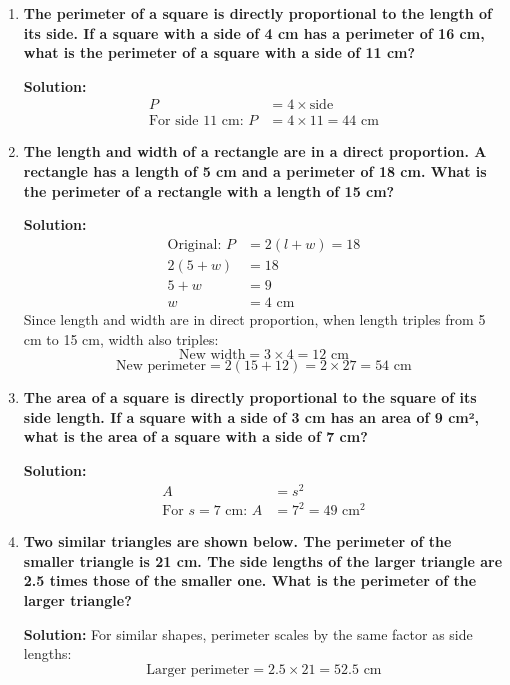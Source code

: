 \documentclass[12pt]{article}
\begin{document}
\begin{enumerate}[resume]
    \item \textbf{The perimeter of a square is directly proportional to the length of its side. If a square with a side of 4 cm has a perimeter of 16 cm, what is the perimeter of a square with a side of 11 cm?}
    
    \textbf{Solution:}
    \begin{align*}
        P &= 4 \times \text{side} \\
        \text{For side 11 cm: } P &= 4 \times 11 = 44 \text{ cm}
    \end{align*}
    
    \item \textbf{The length and width of a rectangle are in a direct proportion. A rectangle has a length of 5 cm and a perimeter of 18 cm. What is the perimeter of a rectangle with a length of 15 cm?}
    
    \textbf{Solution:}
    \begin{align*}
        \text{Original: } P &= 2(l + w) = 18 \\
        2(5 + w) &= 18 \\
        5 + w &= 9 \\
        w &= 4 \text{ cm}
    \end{align*}
    Since length and width are in direct proportion, when length triples from 5 cm to 15 cm, width also triples:
    \[
    \text{New width} = 3 \times 4 = 12 \text{ cm}
    \]
    \[
    \text{New perimeter} = 2(15 + 12) = 2 \times 27 = 54 \text{ cm}
    \]
    
    \item \textbf{The area of a square is directly proportional to the square of its side length. If a square with a side of 3 cm has an area of 9 cm², what is the area of a square with a side of 7 cm?}
    
    \textbf{Solution:}
    \begin{align*}
        A &= s^2 \\
        \text{For } s = 7 \text{ cm: } A &= 7^2 = 49 \text{ cm}^2
    \end{align*}
    
    \item \textbf{Two similar triangles are shown below. The perimeter of the smaller triangle is 21 cm. The side lengths of the larger triangle are 2.5 times those of the smaller one. What is the perimeter of the larger triangle?}
    
    \textbf{Solution:}
    For similar shapes, perimeter scales by the same factor as side lengths:
    \[
    \text{Larger perimeter} = 2.5 \times 21 = 52.5 \text{ cm}
    \]
    

\end{enumerate}
\end{document}
